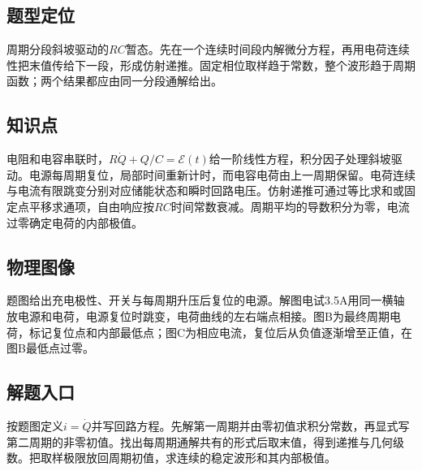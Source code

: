 \documentclass[UTF8,fontset=fandol,a4paper,11pt]{ctexart}
\begin{document}


\subsection*{题型定位}

周期分段斜坡驱动的$RC$暂态。先在一个连续时间段内解微分方程，再用电荷连续性把末值传给下一段，形成仿射递推。固定相位取样趋于常数，整个波形趋于周期函数；两个结果都应由同一分段通解给出。



\subsection*{知识点}

电阻和电容串联时，$R\dot Q+Q/C=\mathcal E(t)$给一阶线性方程，积分因子处理斜坡驱动。电源每周期复位，局部时间重新计时，而电容电荷由上一周期保留。电荷连续与电流有限跳变分别对应储能状态和瞬时回路电压。仿射递推可通过等比求和或固定点平移求通项，自由响应按$RC$时间常数衰减。周期平均的导数积分为零，电流过零确定电荷的内部极值。



\subsection*{物理图像}

题图给出充电极性、开关与每周期升压后复位的电源。解图电试3.5A用同一横轴放电源和电荷，电源复位时跳变，电荷曲线的左右端点相接。图B为最终周期电荷，标记复位点和内部最低点；图C为相应电流，复位后从负值逐渐增至正值，在图B最低点过零。



\subsection*{解题入口}

按题图定义$i=\dot Q$并写回路方程。先解第一周期并由零初值求积分常数，再显式写第二周期的非零初值。找出每周期通解共有的形式后取末值，得到递推与几何级数。把取样极限放回周期初值，求连续的稳定波形和其内部极值。

\end{document}
